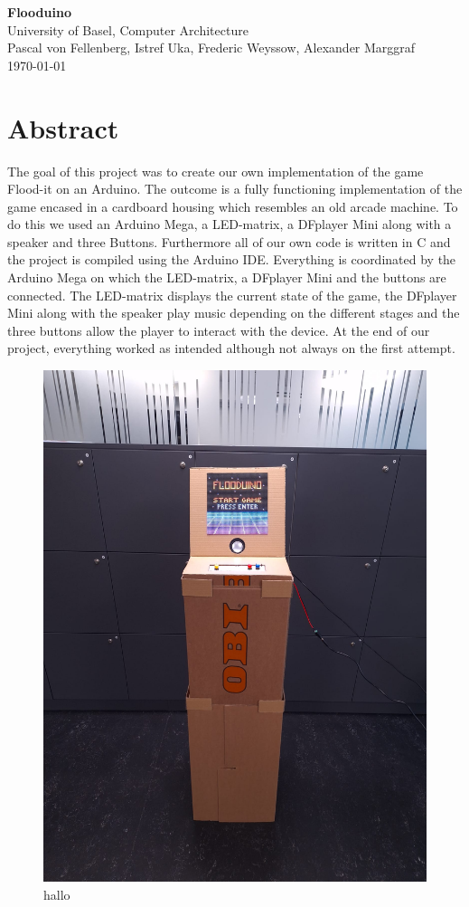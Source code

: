 \documentclass[12pt, a4paper]{article}
\begin{document}
\begin{center}
{\Huge \textbf{Flooduino}}\\
University of Basel, Computer Architecture\\
Pascal von Fellenberg, Istref Uka, Frederic Weyssow, Alexander Marggraf\\
\today
\end{center}

\section*{Abstract}

The goal of this project was to create our own implementation of the game Flood-it on an Arduino.  The outcome is a fully functioning implementation of the game encased in a cardboard housing which resembles an old arcade machine. To do this we used an Arduino Mega, a LED-matrix, a DFplayer Mini along with a speaker and three Buttons. Furthermore all of our own code is written in C and the project is compiled using the Arduino IDE. Everything is coordinated by the Arduino Mega on which the LED-matrix, a DFplayer Mini and the buttons are connected. The LED-matrix displays the current state of the game, the DFplayer Mini along with the speaker play music depending on the different stages and the three buttons allow the player to interact with the device. At the end of our project, everything worked as intended although not always on the first attempt. 

\begin{figure}
    \centering
    \includegraphics[width=0.5\linewidth]{Finished_Product.jpg}
    \caption{hallo}
    \label{fig:enter-label}
\end{figure}
\end{document}
